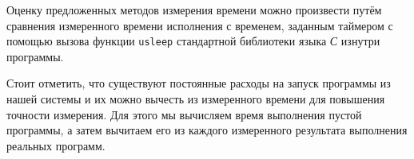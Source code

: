 Оценку предложенных методов измерения времени можно произвести путём сравнения измеренного времени исполнения с временем, заданным таймером с помощью вызова функции \texttt{usleep} стандартной библиотеки языка \textit{С} изнутри программы.

Стоит отметить, что существуют постоянные расходы на запуск программы из нашей системы и их можно вычесть из измеренного времени для повышения точности измерения. Для этого мы вычисляем время выполнения пустой программы, а затем вычитаем его из каждого измеренного результата выполнения реальных программ.
